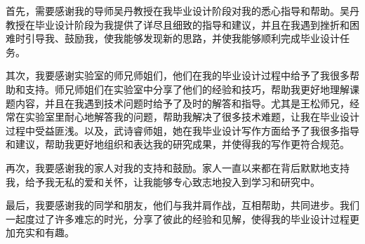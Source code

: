 \documentclass{Diploma}
\begin{document}
\Acknowledgments%
首先，需要感谢我的导师吴丹教授在我毕业设计阶段对我的悉心指导和帮助。吴丹教授在毕业设计阶段为我提供了详尽且细致的指导和建议，并且在我遇到挫折和困难时引导我、鼓励我，使我能够发现新的思路，并使我能够顺利完成毕业设计任务。

其次，我要感谢实验室的师兄师姐们，他们在我的毕业设计过程中给予了我很多帮助和支持。师兄师姐们在实验室中分享了他们的经验和技巧，帮助我更好地理解课题内容，并且在我遇到技术问题时给予了及时的解答和指导。尤其是王松师兄，经常在实验室里耐心地解答我的问题，帮助我解决了很多技术难题，让我在毕业设计过程中受益匪浅。以及，武诗睿师姐，她在我毕业设计写作方面给予了我很多指导和建议，帮助我更好地组织和表达我的研究成果，并使得我的写作更符合规范。

再次，我要感谢我的家人对我的支持和鼓励。家人一直以来都在背后默默地支持我，给予我无私的爱和关怀，让我能够专心致志地投入到学习和研究中。

最后，我要感谢我的同学和朋友，他们与我并肩作战，互相帮助，共同进步。我们一起度过了许多难忘的时光，分享了彼此的经验和见解，使得我的毕业设计过程更加充实和有趣。

\Statement%
\end{document}
